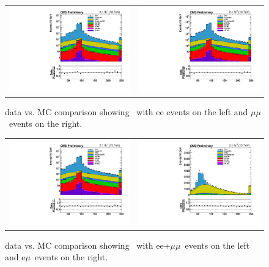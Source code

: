 \begin{figure}[!ht]
  \begin{center}
    \begin{tabular}{cc}
      \includegraphics[width=0.4\linewidth]{evtsel/figs/h_mll_ee_signalregion_inclusive_passtrig.pdf} &
      \includegraphics[width=0.4\linewidth]{evtsel/figs/h_mll_mm_signalregion_inclusive_passtrig.pdf} \\
    \end{tabular}
    \caption{
      \label{fig:datavsmc_mll}
      data vs. MC comparison showing \mll\ with ee events on the left and $\mu\mu$~events on the right.
    }
  \end{center}
\end{figure}

\begin{figure}[!ht]
  \begin{center}
    \begin{tabular}{cc}
      \includegraphics[width=0.4\linewidth]{evtsel/figs/h_mll_ll_signalregion_inclusive_passtrig.pdf} &
      \includegraphics[width=0.4\linewidth]{evtsel/figs/h_mll_em_signalregion_inclusive_passtrig.pdf} \\
    \end{tabular}
    \caption{
      \label{fig:datavsmc_mll}
      data vs. MC comparison showing \mll\ with ee+$\mu\mu$~events on the left and e$\mu$~events on the right.
    }
  \end{center}
\end{figure}

